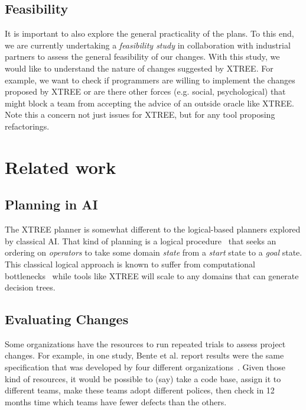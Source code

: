 \documentclass{sig-alternate}
\begin{document}
\subsection{  Feasibility}\label{sect:feasibility}
It is important to also explore the general practicality of the plans. To this end, we are currently undertaking a \textit{feasibility study} in collaboration with industrial partners to assess the general feasibility of our changes. With this study, we would like to understand the nature of changes suggested by XTREE. For example, we want to check if programmers are willing to implement the changes proposed by XTREE or are there other forces (e.g. social, psychological) that might block a team from accepting the advice of an outside oracle like XTREE. Note this a concern not just issues for XTREE, but for any tool proposing refactorings.
 
\section{Related work}

\subsection{Planning in AI}

The XTREE planner is somewhat different to the logical-based planners explored by 
classical AI. 
That kind of planning is a logical procedure~\cite{Fikes1971}
that seeks an ordering on {\em operators} to take some domain
{\em state} from a {\em start} state to a {\em  goal} state.
This classical logical approach is known to suffer from
computational bottlenecks~\cite{Bylander1994} while tools like XTREE will scale to any domains
that can generate decision trees.
  
\subsection{Evaluating Changes}

Some organizations have the resources to 
run repeated trials to assess  project changes.
For example, in one   study, Bente et al. report results
were the same  specification that was developed  by four different organizations~\cite{Anda2009}. Given those kind of resources, it would be possible
to (say) take a code base, assign it to different teams, make these teams  adopt different polices,
then check in 12 months time
 which teams have fewer defects than the others.  
 
\end{document}

